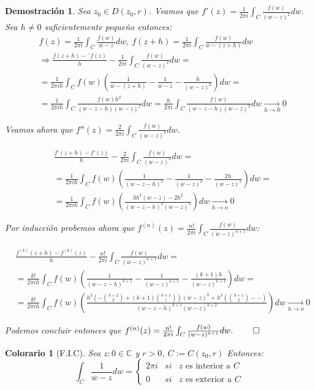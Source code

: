 \documentclass[12pt]{book}
\newtheorem*{dem}{Demostración}
\newtheorem{col}{Colorario}[chapter]
\newcommand{\C}{\mathbb{C}}
\begin{document}
\begin{dem}
Sea $z_0\in D(z_0,r)$. Veamos que $f'(z) = \frac{1}{2\pi i}\int_C \frac{f(w)}{(w-z)^{2}}dw$.
Sea $h\neq 0$ suficientemente pequeño entonces:
\begin{align*}
&f(z) = \frac{1}{2\pi i}\int_C \frac{f(w)}{w-z}dw,\ f(z+h) = \frac{1}{2\pi i}\int_C \frac{f(w)}{w-(z+h)}dw\\
&\Rightarrow \frac{f(z+h)-´f(z)}{h}- \frac{1}{2\pi i}\int_C \frac{f(w)}{(w-z)^{2}}dw =\\
&= \frac{1}{2\pi ih}\int_C f(w)\left(\frac{1}{w-(z+h)}-\frac{1}{w-z}-\frac{h}{(w-z)^2}\right)dw=\\
&= \frac{1}{2\pi i h}\int_C \frac{f(w)h^2}{(w-z-h)(w-z)^2}dw = \frac{h}{2\pi i}\int_C \frac{f(w)}{(w-z-h)(w-z)^2}dw \xrightarrow[h\to 0]{} 0
\end{align*}

Veamos ahora que $f''(z) = \frac{2}{2\pi i}\int_C \frac{f(w)}{(w-z)^{3}}dw$.

\begin{align*}
&\frac{f'(z+h)-f'(z)}{h} - \frac{2}{2\pi i}\int_C \frac{f(w)}{(w-z)^{3}}dw =\\
&=\frac{1}{2\pi i h}\int_C f(w)\left(\frac{1}{(w-z-h)^2}-\frac{1}{(w-z)^2}-\frac{2h}{(w-z)^2}\right)dw =\\
&= \frac{1}{2\pi ih}\int_C f(w) \left(\frac{3h^2(w-z)-2h^2}{(w-z-h)^2(w-z)^3}\right)dw \xrightarrow[h\to o]{} 0
\end{align*}

Por inducción probemos ahora  que $f^{(n)}(z) = \frac{n!}{2\pi i}\int_C \frac{f(w)}{(w-z)^{n+1}}dw$:

\begin{align*}
&\frac{f^{(k)}(z+h)-f^{(k)}(z)}{h} - \frac{n!}{2\pi i}\int_C \frac{f(w)}{(w-z)^{n+1}}dw=\\
&= \frac{k!}{2\pi i h}\int_Cf(w)\left(\frac{1}{(w-z-h)^{k+1}}-\frac{1}{(w-z)^{k+1}}-\frac{(k+1)h}{(w-z)^{k+1}}\right)dw=\\
&= \frac{k!}{2\pi i h}\int_C f(w)\left(\frac{h^2(-{k+2 \choose 2} + (k+1){k+1\choose 1})(w-z)^{k}+h^3({k+1\choose 2} -\cdots)}{(w-z-h)^{k+1}(w-z)^{k+2}}\right)dw \xrightarrow[h\to o]{} 0
\end{align*}

Podemos concluir entonces que $f^{(n)}(z) = \frac{n!}{2\pi i}\int_C \frac{f(w)}{(w-z)^{n+1}}dw.\ \qed$
\end{dem}


\begin{col}[F.I.C]
Sea $z:0\in\C$ y $r>0$, $C:=C(z_0,r)$ Entonces:
$$
\int_C \frac{1}{w-z}dw = \left\{ \begin{array}{lcc}
             2\pi i &   si  & z\text{ es interior a } C \\
             \\ 0 & si & z\text{ es exterior a } C
             \end{array}\right.
$$
\end{col}
\end{document}
